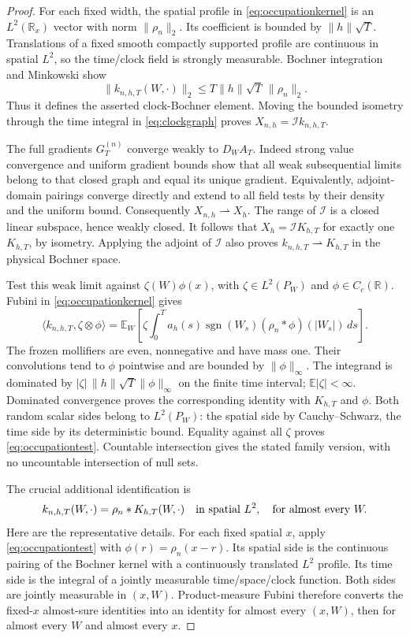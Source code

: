 \documentclass[11pt]{article}
\newcommand{\R}{\mathbb R}\newcommand{\E}{\mathbb E}
\begin{document}
\begin{proof}
For each fixed width, the spatial profile in
\eqref{eq:occupationkernel} is an $L^2(\R_x)$ vector with norm
$\|\rho_n\|_2$. Its coefficient is bounded by $\|h\|\sqrt T$.
Translations of a fixed smooth compactly supported profile are
continuous in spatial $L^2$, so the time/clock field is strongly
measurable. Bochner integration and Minkowski show
\[
 \|k_{n,h,T}(W,\cdot)\|_2
 \leq T\|h\|\sqrt T\,\|\rho_n\|_2.
\]
Thus it defines the asserted clock-Bochner element. Moving the bounded
isometry through the time integral in \eqref{eq:clockgraph} proves
$X_{n,h}=\mathcal I k_{n,h,T}$.

The full gradients $G_T^{(n)}$ converge weakly to $D_WA_T$.
Indeed strong value convergence and uniform gradient bounds show that
all weak subsequential limits belong to that closed graph and equal its
unique gradient. Equivalently, adjoint-domain pairings converge directly
and extend to all field tests by their density and the uniform bound.
Consequently $X_{n,h}\rightharpoonup X_h$. The range of $\mathcal I$
is a closed linear subspace, hence weakly closed. It follows that
$X_h=\mathcal I K_{h,T}$ for exactly one $K_{h,T}$, by isometry.
Applying the adjoint of $\mathcal I$ also proves
$k_{n,h,T}\rightharpoonup K_{h,T}$ in the physical Bochner space.

Test this weak limit against $\zeta(W)\phi(x)$, with
$\zeta\in L^2(P_W)$ and $\phi\in C_c(\R)$. Fubini in
\eqref{eq:occupationkernel} gives
\[
 \langle k_{n,h,T},\zeta\otimes\phi\rangle
 =\mathbb E_W\!\left[\zeta\int_0^T a_h(s)\operatorname{sgn}(W_s)
                 (\rho_n*\phi)(|W_s|)\,ds\right].
\]
The frozen mollifiers are even, nonnegative and have mass one.
Their convolutions tend to $\phi$ pointwise and are bounded by
$\|\phi\|_\infty$. The integrand is dominated by
$|\zeta|\,\|h\|\sqrt T\|\phi\|_\infty$ on the finite time interval;
$\mathbb E|\zeta|<\infty$. Dominated convergence proves the corresponding
identity with $K_{h,T}$ and $\phi$. Both random scalar sides belong to
$L^2(P_W)$: the spatial side by Cauchy--Schwarz, the time side by its
deterministic bound. Equality against all $\zeta$ proves
\eqref{eq:occupationtest}. Countable intersection gives the stated
family version, with no uncountable intersection of null sets.

The crucial additional identification is
\begin{equation}\label{eq:occupationconvolution}
 k_{n,h,T}(W,\cdot)=\rho_n*K_{h,T}(W,\cdot)
 \quad\hbox{in spatial }L^2,\quad\hbox{for almost every }W.
\end{equation}
Here are the representative details. For each fixed spatial $x$, apply
\eqref{eq:occupationtest} with $\phi(r)=\rho_n(x-r)$.
Its spatial side is the continuous pairing of the Bochner kernel with a
continuously translated $L^2$ profile. Its time side is the integral of
a jointly measurable time/space/clock function. Both sides are jointly
measurable in $(x,W)$. Product-measure Fubini therefore converts the
fixed-$x$ almost-sure identities into an identity for almost every
$(x,W)$, then for almost every $W$ and almost every $x$.


\end{proof}
\end{document}
